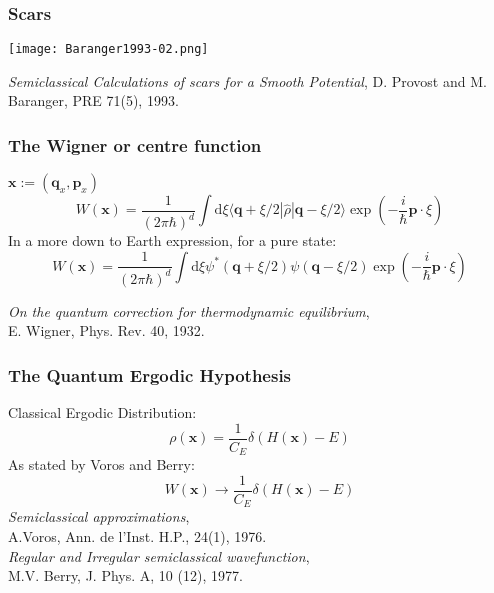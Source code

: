 \documentclass{beamer}
\newcommand{\ihb}{\frac{i}{\hbar}}
\newcommand{\xfase}{\mathbf{x}}
\newcommand{\qfase}{\mathbf{q}}
\newcommand{\pfase}{\mathbf{p}}
\newcommand{\bra}[1]{\langle #1|}
\newcommand{\ket}[1]{|#1\rangle}
\newcommand{\rd}{\!\mathrm{d}}
\begin{document}
\begin{frame}
  \frametitle{Scars}
  \begin{center}
    \texttt{[image: Baranger1993-02.png]} 
  \end{center}
  \emph{Semiclassical Calculations of scars for a Smooth Potential},
  D. Provost and M. Baranger, PRE 71(5), 1993.

\end{frame}    


\begin{frame}
  \frametitle{The Wigner or centre function}
  $\xfase:=(\qfase_x, \pfase_x)$
  \begin{equation}
    W(\xfase)=\frac{1}{(2\pi\hbar)^d}\int \rd \xi \bra{\qfase 
      +\xi/2}\hat{\rho}\ket{\qfase-\xi/2}\exp(-\ihb \pfase \cdot \xi) 
  \end{equation}
  In a more down to Earth  expression, for a pure state:
  \begin{equation}
    W(\xfase)=\frac{1}{(2\pi\hbar)^d}\int \rd \xi \psi^*(\qfase 
      +\xi/2)\psi(\qfase-\xi/2)\exp(-\ihb \pfase \cdot \xi) 
  \end{equation}
  
    \emph{On the quantum correction for thermodynamic equilibrium},\\
    E. Wigner, Phys. Rev. 40, 1932.

  \end{frame}    

\begin{frame}
  \frametitle{The Quantum Ergodic Hypothesis}
  Classical Ergodic Distribution:
  \begin{equation}
  \rho(\xfase)=\frac{1}{C_E} \delta(H(\xfase)-E)
  \end{equation}
  As stated by Voros and Berry:
  \begin{equation}
    W(\xfase)\rightarrow\frac{1}{C_E} \delta(H(\xfase)-E)
  \end{equation}
  \emph{Semiclassical approximations},\\
  A.Voros, Ann. de l'Inst. H.P., 24(1), 1976.\\
  \emph{Regular and Irregular semiclassical wavefunction},\\
  M.V. Berry, J. Phys. A, 10 (12), 1977.
\end{frame}
\end{document}
